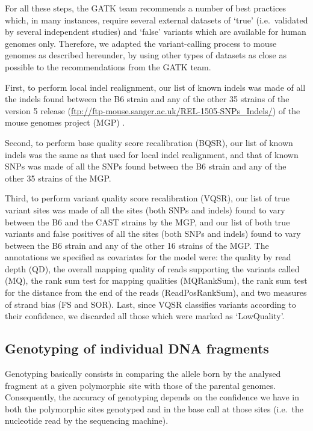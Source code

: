 For all these steps, the GATK team recommends a number of best practices \citep{depristo2011framework, vanderauwera2013fastq} which, in many instances, require several external datasets of ‘true’ (i.e.\ validated by several independent studies) and ‘false’ variants which are available for human genomes only.
Therefore, we adapted the variant-calling process to mouse genomes as described hereunder, by using other types of datasets as close as possible to the recommendations from the GATK team. 

First, to perform local indel realignment, our list of known indels was made of all the indels found between the B6 strain and any of the other 35 strains of the version 5 release (\url{ftp://ftp-mouse.sanger.ac.uk/REL-1505-SNPs_Indels/}) of the mouse genomes project (MGP) \citep{keane2011mouse}.

Second, to perform base quality score recalibration (BQSR), our list of known indels was the same as that used for local indel realignment, and that of known SNPs was made of all the SNPs found between the B6 strain and any of the other 35 strains of the MGP\@.

Third, to perform variant quality score recalibration (VQSR), our list of true variant sites was made of all the sites (both SNPs and indels) found to vary between the B6 and the CAST strains by the MGP, and our list of both true variants and false positives of all the sites (both SNPs and indels) found to vary between the B6 strain and any of the other 16 strains of the MGP\@. 
The annotations we specified as covariates for the model were: the quality by read depth (QD), the overall mapping quality of reads supporting the variants called (MQ), the rank sum test for mapping qualities (MQRankSum), the rank sum test for the distance from the end of the reads (ReadPosRankSum), and two measures of strand bias (FS and SOR).
Last, since VQSR classifies variants according to their confidence, we discarded all those which were marked as ‘LowQuality’.




\subsection{Genotyping of individual DNA fragments}

Genotyping basically consists in comparing the allele born by the analysed fragment at a given polymorphic site with those of the parental genomes.
Consequently, the accuracy of genotyping depends on the confidence we have in both the polymorphic sites genotyped and in the base call at those sites (i.e.\ the nucleotide read by the sequencing machine).

